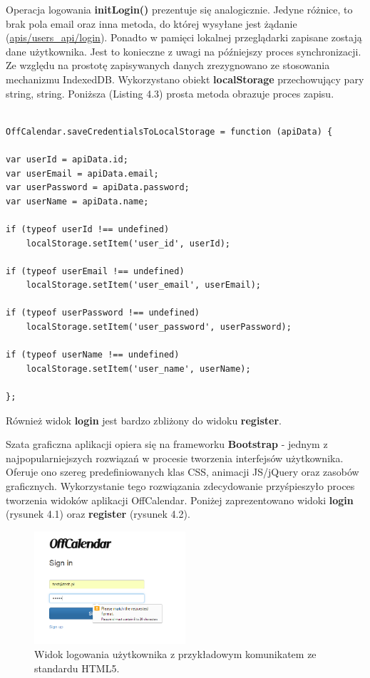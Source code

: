 Operacja logowania \textbf{initLogin()} prezentuje się analogicznie. Jedyne różnice, to brak pola email oraz inna metoda, do której wysyłane jest żądanie (\url{apis/users_api/login}). Ponadto w pamięci lokalnej przeglądarki zapisane zostają dane użytkownika. Jest to konieczne z uwagi na późniejszy proces synchronizacji. Ze względu na prostotę zapisywanych danych zrezygnowano ze stosowania mechanizmu IndexedDB. Wykorzystano obiekt \textbf{localStorage} przechowujący pary string, string. Poniższa (Listing 4.3) prosta metoda obrazuje proces zapisu.

\begin{lstlisting}[caption=Zapis danych logowania do obiektu localStorage w pamięci podręcznej przeglądarki., label=amb, captionpos=b]

OffCalendar.saveCredentialsToLocalStorage = function (apiData) {

var userId = apiData.id;
var userEmail = apiData.email;
var userPassword = apiData.password;
var userName = apiData.name;

if (typeof userId !== undefined)
    localStorage.setItem('user_id', userId);

if (typeof userEmail !== undefined)
    localStorage.setItem('user_email', userEmail);

if (typeof userPassword !== undefined)
    localStorage.setItem('user_password', userPassword);

if (typeof userName !== undefined)
    localStorage.setItem('user_name', userName);

};

\end{lstlisting}

Również widok \textbf{login} jest bardzo zbliżony do widoku \textbf{register}.

Szata graficzna aplikacji opiera się na frameworku \textbf{Bootstrap}\cite{bootstrap} - jednym z najpopularniejszych rozwiązań w procesie tworzenia interfejsów użytkownika. Oferuje ono szereg predefiniowanych klas CSS, animacji JS/jQuery oraz zasobów graficznych. Wykorzystanie tego rozwiązania zdecydowanie przyśpieszyło proces tworzenia widoków aplikacji OffCalendar. Poniżej zaprezentowano widoki \textbf{login} (rysunek 4.1) oraz \textbf{register} (rysunek 4.2).

\begin{figure}[H]
\centering
\includegraphics[width=0.5\textwidth]{signin.png}
\caption{Widok logowania użytkownika z przykładowym komunikatem ze standardu HTML5.}
\end{figure}

